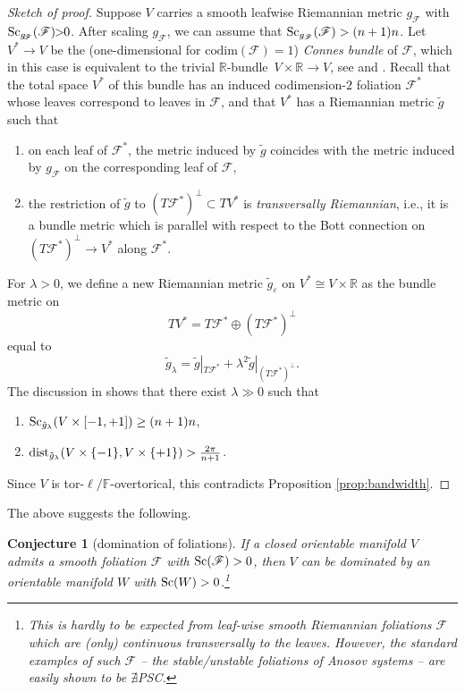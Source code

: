 \documentclass[pdftex]{sigma}
\numberwithin{equation}{section}
\newtheorem{Conjecture}[Theorem]{Conjecture}
 { \theoremstyle{definition}
\newtheorem{Definition}[Theorem]{Definition}
\newtheorem{Note}[Theorem]{Note}
\newtheorem{Example}[Theorem]{Example}
\newtheorem{Remark}[Theorem]{Remark}
}
\newcommand{\F}{\mathbb{F}}
\newcommand{\R}{\mathbb{R}}
\newcommand{\eps}{\varepsilon}
\newcommand{\Sc}{{\rm Sc}}
\newcommand{\myicon}{$\,\,\,\triangleright$}
\newcommand{\no}{{\color{brown!70!black}$\nexists$}{\sf PSC}}
\begin{document}
\begin{proof}[Sketch of proof] Suppose $V$ carries a smooth leafwise Riemannian metric $g_{\!\mathscr F}$ with ${\Sc_{g_{\!\mathscr F}} (\mathscr F)\!\! > \!\!0}$.
After scaling $g_{\mathscr F}$, we can assume that $\Sc_{g_{\mathscr F}} (\mathscr F) > (n+1)n$.
Let $V^* \to V $ be the (one-dimensional for $\mathrm{codim} (\mathscr F)=1$) {\it Connes bundle} of $\mathscr F$, which in this case is equivalent to the trivial $\R$-bundle~${V\times \mathbb R \to V}$, see \cite[Sections $1\frac{7}{8}$ and $9\frac {2}{3}$]{Gr1996} and \cite[Section 6.5.2]{Gr21}.
Recall \cite[p.\ 9]{Gr1996} that the total space $V^*$ of this bundle has an induced codimension-$2$ foliation $\mathscr F^*$ whose leaves correspond to leaves in $\mathscr F$, and that $V^*$ has a Riemannian metric $\tilde g$ such that
\begin{enumerate}[\myicon]\itemsep=0pt
 \item on each leaf of $\mathscr F^*$, the metric induced by $\tilde g$ coincides with the metric induced by $g_{\mathscr F}$ on the corresponding leaf of $\mathscr F$,
 \item the restriction of $\tilde g$ to $(T \mathscr F^*)^{\perp} \subset TV^*$ is {\em transversally Riemannian}, i.e., it is a bundle metric which is parallel with respect to the Bott connection on $(T \mathscr F^*)^{\perp} \to V^*$ along $\mathscr F^*$.
\end{enumerate}

For $\lambda > 0$, we define a new Riemannian metric $\tilde g_{\eps}$ on $V^* \cong V \times \R$ as the bundle metric on
\[
{TV^* = T\mathscr F^* \oplus (T\mathscr F^*)^{\perp}}
\]
 equal to
\[
 \tilde g_\lambda = \tilde g|_{T\mathscr F^*} + \lambda^2 \tilde g|_{(T\mathscr F^*)^{\perp}}.
\]
The discussion in \cite[p.\ 315]{Gr21} shows that there exist $\lambda \gg 0$ such that
\begin{enumerate}[\myicon]\itemsep=0pt
\item $\Sc_{\tilde g_{\lambda}} (V \times [-1, +1]) \geq (n+1)n$,
\item ${\rm dist}_{\tilde g_\lambda}( V \times \{-1\}, V\times \{+1\}) > \frac{2\pi}{n+1}$.
\end{enumerate}
Since $V$ is tor-$\ell/\F$-overtorical, this contradicts Proposition \ref{prop:bandwidth}.
\end{proof}

The above suggests the following.

\begin{Conjecture}[domination of foliations] If a closed orientable manifold $V$ admits a smooth foliation $\mathscr F$ with $\Sc(\mathscr F) > 0$, then $V$ can be dominated by an orientable manifold $W$ with $\Sc(W)>0$.\footnote{This is hardly to be expected from {\it leaf-wise} smooth Riemannian foliations $\mathscr F$ which are (only) {\it continuous} transversally to the leaves.
However, the standard examples of such $\mathscr F$ -- the stable/unstable foliations of {\it Anosov systems} -- are easily shown to be \no.}
\end{Conjecture}
\end{document}
